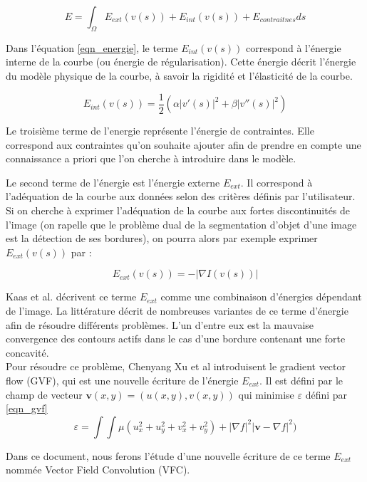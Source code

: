 \begin{equation}
E = \int_{\Omega}{E_{ext}(v(s)) + E_{int}(v(s)) + E_{contraitnes} ds}
\label{eqn_energie}
\end{equation}

Dans l'équation \ref{eqn_energie}, le terme $E_{int}(v(s))$ correspond à l'énergie interne de la courbe (ou énergie de régularisation). Cette énergie décrit l'énergie du modèle physique de la courbe, à savoir la rigidité et l'élasticité de la courbe.

\begin{equation}
E_{int}(v(s)) = \frac{1}{2}\left(\alpha|v'(s)|^{2}+\beta|v''(s)|^{2}\right)
\end{equation}

Le troisième terme de l'energie représente l'énergie de contraintes. Elle correspond aux contraintes qu'on souhaite ajouter afin de prendre en compte une connaissance a priori que l'on cherche à introduire dans le modèle.

Le second terme de l'énergie est l'énergie externe $E_{ext}$. Il correspond à l'adéquation de la courbe aux données selon des critères définis par l'utilisateur. Si on cherche à exprimer l'adéquation de la courbe aux fortes discontinuités de l'image (on rapelle que le problème dual de la segmentation d'objet d'une image est la détection de ses bordures), on pourra alors par exemple exprimer $E_{ext}(v(s))$ par :

\begin{equation}
E_{ext}(v(s)) = -|\nabla I(v(s))|
\end{equation}

Kaas et al. décrivent ce terme $E_{ext}$ comme une combinaison d'énergies dépendant de l'image. La littérature décrit de nombreuses variantes de ce terme d'énergie afin de résoudre différents problèmes. L'un d'entre eux est la mauvaise convergence des contours actifs dans le cas d'une bordure contenant une forte concavité.\\ %

Pour résoudre ce problème, Chenyang Xu et al introduisent le gradient vector flow (GVF), qui est une nouvelle écriture de l'énergie $E_{ext}$. Il est défini par le champ de vecteur $\textbf{v}(x,y) = (u(x,y), v(x,y))$ qui minimise $\varepsilon$ défini par \ref{eqn_gvf} %
\begin{equation}
\varepsilon = \int\int \mu(u_{x}^{2}+u_{y}^{2}+v_{x}^{2}+v_{y}^{2})+|\nabla f|^{2}|\textbf{v}-\nabla f|^{2})
\label{eqn_gvf}
\end{equation}

Dans ce document, nous ferons l'étude d'une nouvelle écriture de ce terme $E_{ext}$ nommée Vector Field Convolution (VFC).
